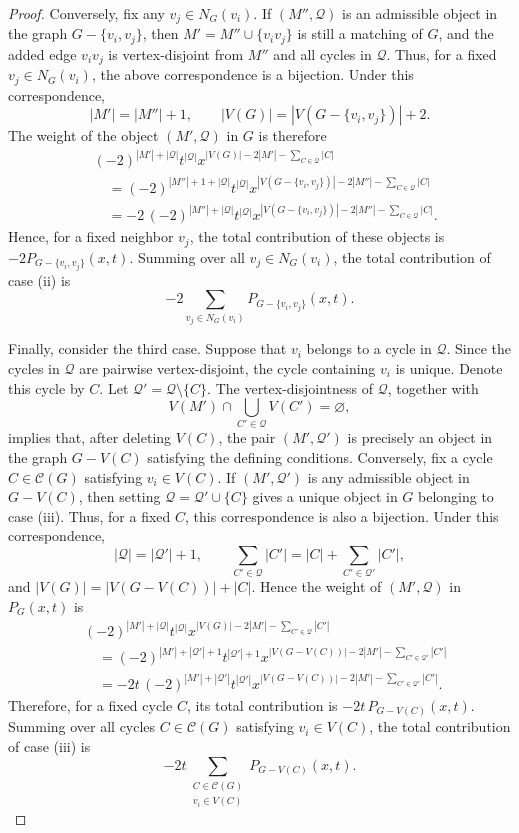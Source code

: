 \documentclass[11pt, a4paper]{article}
\theoremstyle{plain}
\begin{document}
\begin{proof}
Conversely, fix any $v_j\in N_G(v_i)$. If $(M'',\mathcal{Q})$ is
an admissible object in the graph $G-\{v_i,v_j\}$, then
$M'=M''\cup\{v_iv_j\}$
is still a matching of $G$, and the added edge $v_iv_j$ is vertex-disjoint from $M''$ and all cycles in $\mathcal{Q}$.
Thus, for a fixed $v_j\in N_G(v_i)$, the above correspondence is a bijection.
Under this correspondence,
\[
|M'|=|M''|+1,
\qquad
|V(G)|=|V(G-\{v_i,v_j\})|+2.
\]
The weight of the object $(M',\mathcal{Q})$ in $G$ is therefore
\begin{align*}
&(-2)^{|M'|+|\mathcal{Q}|}t^{|\mathcal{Q}|}
 x^{|V(G)|-2|M'|-\sum_{C\in \mathcal{Q}}|C|}
\\
&\quad=
(-2)^{|M''|+1+|\mathcal{Q}|}t^{|\mathcal{Q}|}
 x^{|V(G-\{v_i,v_j\})|-2|M''|-\sum_{C\in \mathcal{Q}}|C|}
\\
&\quad=
-2\,(-2)^{|M''|+|\mathcal{Q}|}t^{|\mathcal{Q}|}
 x^{|V(G-\{v_i,v_j\})|-2|M''|-\sum_{C\in \mathcal{Q}}|C|}.
\end{align*}
Hence, for a fixed neighbor $v_j$, the total contribution of these objects is
$-2P_{G-\{v_i,v_j\}}(x,t)$.
Summing over all $v_j\in N_G(v_i)$, the total contribution of case (ii) is
\[
-2\sum_{v_j\in N_G(v_i)}P_{G-\{v_i,v_j\}}(x,t).
\]

Finally, consider the third case.
Suppose that $v_i$ belongs to a cycle in $\mathcal{Q}$.
Since the cycles in $\mathcal{Q}$ are pairwise vertex-disjoint, the cycle containing $v_i$ is unique.
Denote this cycle by $C$. Let
$\mathcal{Q}'=\mathcal{Q}\setminus\{C\}$.
The vertex-disjointness of $\mathcal{Q}$, together with
\[
V(M')\cap\bigcup_{C'\in \mathcal{Q}}V(C')=\varnothing,
\]
implies that, after deleting $V(C)$, the pair $(M',\mathcal{Q}')$ is precisely an object in the graph
$G-V(C)$ satisfying the defining conditions.
Conversely, fix a cycle $C\in\mathcal{C}(G)$ satisfying $v_i\in V(C)$.
If $(M',\mathcal{Q}')$ is any admissible object in $G-V(C)$, then setting
$\mathcal{Q}=\mathcal{Q}'\cup\{C\}$
gives a unique object in $G$ belonging to case (iii). Thus,
for a fixed $C$, this correspondence is also a bijection.
Under this correspondence,
\[
|\mathcal{Q}|=|\mathcal{Q}'|+1,
\qquad
\sum_{C'\in \mathcal{Q}}|C'|
=|C|+\sum_{C'\in \mathcal{Q}'}|C'|,
\]
and $|V(G)|=|V(G-V(C))|+|C|$.
Hence the weight of $(M',\mathcal{Q})$ in $P_G(x,t)$ is
\begin{align*}
&(-2)^{|M'|+|\mathcal{Q}|}t^{|\mathcal{Q}|}
 x^{|V(G)|-2|M'|-\sum_{C'\in \mathcal{Q}}|C'|}
\\
&\quad=
(-2)^{|M'|+|\mathcal{Q}'|+1}t^{|\mathcal{Q}'|+1}
 x^{|V(G-V(C))|-2|M'|-\sum_{C'\in \mathcal{Q}'}|C'|}
\\
&\quad=
-2t\,(-2)^{|M'|+|\mathcal{Q}'|}t^{|\mathcal{Q}'|}
 x^{|V(G-V(C))|-2|M'|-\sum_{C'\in \mathcal{Q}'}|C'|}.
\end{align*}
Therefore, for a fixed cycle $C$, its total contribution is
$-2t\, P_{G-V(C)}(x,t)$.
Summing over all cycles $C\in\mathcal{C}(G)$ satisfying $v_i\in V(C)$,
the total contribution of case (iii) is
\[
-2t\sum_{\substack{C\in\mathcal{C}(G)\\v_i\in V(C)}}P_{G-V(C)}(x,t).
\]


\end{proof}
\end{document}

